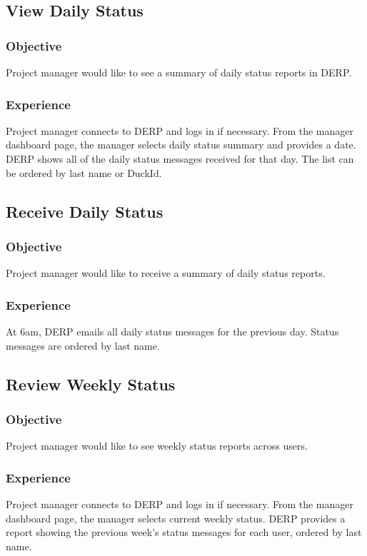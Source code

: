 \subsection*{View Daily Status}
\subsubsection*{Objective}
Project manager would like to see a summary of daily status reports in DERP.
\subsubsection*{Experience}
Project manager connects to DERP and logs in if necessary. From the manager dashboard page, the manager selects daily status summary and provides a date. DERP shows all of the daily status messages received for that day. The list can be ordered by last name or DuckId.


\subsection*{Receive Daily Status}
\subsubsection*{Objective}
Project manager would like to receive a summary of daily status reports.
\subsubsection*{Experience}
At 6am, DERP emails all daily status messages for the previous day. Status messages are ordered by last name.


\subsection*{Review Weekly Status}
\subsubsection*{Objective}
Project manager would like to see weekly status reports across users.
\subsubsection*{Experience}
Project manager connects to DERP and logs in if necessary. From the manager dashboard page, the manager selects current weekly status. DERP provides a report showing the previous week's status messages for each user, ordered by last name. 


